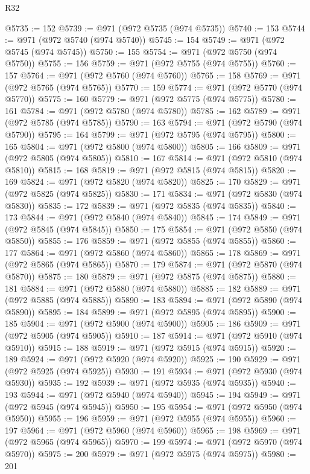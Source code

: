 \begin{lexlean}{R32}
\begin{coremodule}
@5735 := 152
@5739 := @971 (@972 @5735 (@974 @5735))
@5740 := 153
@5744 := @971 (@972 @5740 (@974 @5740))
@5745 := 154
@5749 := @971 (@972 @5745 (@974 @5745))
@5750 := 155
@5754 := @971 (@972 @5750 (@974 @5750))
@5755 := 156
@5759 := @971 (@972 @5755 (@974 @5755))
@5760 := 157
@5764 := @971 (@972 @5760 (@974 @5760))
@5765 := 158
@5769 := @971 (@972 @5765 (@974 @5765))
@5770 := 159
@5774 := @971 (@972 @5770 (@974 @5770))
@5775 := 160
@5779 := @971 (@972 @5775 (@974 @5775))
@5780 := 161
@5784 := @971 (@972 @5780 (@974 @5780))
@5785 := 162
@5789 := @971 (@972 @5785 (@974 @5785))
@5790 := 163
@5794 := @971 (@972 @5790 (@974 @5790))
@5795 := 164
@5799 := @971 (@972 @5795 (@974 @5795))
@5800 := 165
@5804 := @971 (@972 @5800 (@974 @5800))
@5805 := 166
@5809 := @971 (@972 @5805 (@974 @5805))
@5810 := 167
@5814 := @971 (@972 @5810 (@974 @5810))
@5815 := 168
@5819 := @971 (@972 @5815 (@974 @5815))
@5820 := 169
@5824 := @971 (@972 @5820 (@974 @5820))
@5825 := 170
@5829 := @971 (@972 @5825 (@974 @5825))
@5830 := 171
@5834 := @971 (@972 @5830 (@974 @5830))
@5835 := 172
@5839 := @971 (@972 @5835 (@974 @5835))
@5840 := 173
@5844 := @971 (@972 @5840 (@974 @5840))
@5845 := 174
@5849 := @971 (@972 @5845 (@974 @5845))
@5850 := 175
@5854 := @971 (@972 @5850 (@974 @5850))
@5855 := 176
@5859 := @971 (@972 @5855 (@974 @5855))
@5860 := 177
@5864 := @971 (@972 @5860 (@974 @5860))
@5865 := 178
@5869 := @971 (@972 @5865 (@974 @5865))
@5870 := 179
@5874 := @971 (@972 @5870 (@974 @5870))
@5875 := 180
@5879 := @971 (@972 @5875 (@974 @5875))
@5880 := 181
@5884 := @971 (@972 @5880 (@974 @5880))
@5885 := 182
@5889 := @971 (@972 @5885 (@974 @5885))
@5890 := 183
@5894 := @971 (@972 @5890 (@974 @5890))
@5895 := 184
@5899 := @971 (@972 @5895 (@974 @5895))
@5900 := 185
@5904 := @971 (@972 @5900 (@974 @5900))
@5905 := 186
@5909 := @971 (@972 @5905 (@974 @5905))
@5910 := 187
@5914 := @971 (@972 @5910 (@974 @5910))
@5915 := 188
@5919 := @971 (@972 @5915 (@974 @5915))
@5920 := 189
@5924 := @971 (@972 @5920 (@974 @5920))
@5925 := 190
@5929 := @971 (@972 @5925 (@974 @5925))
@5930 := 191
@5934 := @971 (@972 @5930 (@974 @5930))
@5935 := 192
@5939 := @971 (@972 @5935 (@974 @5935))
@5940 := 193
@5944 := @971 (@972 @5940 (@974 @5940))
@5945 := 194
@5949 := @971 (@972 @5945 (@974 @5945))
@5950 := 195
@5954 := @971 (@972 @5950 (@974 @5950))
@5955 := 196
@5959 := @971 (@972 @5955 (@974 @5955))
@5960 := 197
@5964 := @971 (@972 @5960 (@974 @5960))
@5965 := 198
@5969 := @971 (@972 @5965 (@974 @5965))
@5970 := 199
@5974 := @971 (@972 @5970 (@974 @5970))
@5975 := 200
@5979 := @971 (@972 @5975 (@974 @5975))
@5980 := 201

\end{coremodule}
\end{lexlean}
